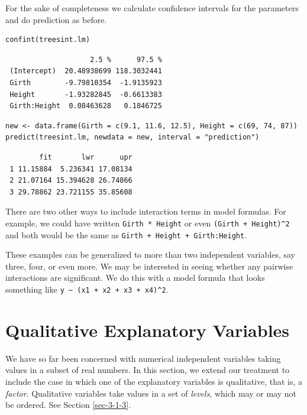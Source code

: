 \documentclass[captions=tableheading]{scrbook}
\begin{document}
For the sake of completeness we calculate confidence intervals for the parameters and do prediction as before.


\lstset{language=R}
\begin{lstlisting}
confint(treesint.lm)
\end{lstlisting}

\begin{verbatim}
                    2.5 %      97.5 %
 (Intercept)  20.48938699 118.3032441
 Girth        -9.79810354  -1.9135923
 Height       -1.93282845  -0.6613383
 Girth:Height  0.08463628   0.1846725
\end{verbatim}


\lstset{language=R}
\begin{lstlisting}
new <- data.frame(Girth = c(9.1, 11.6, 12.5), Height = c(69, 74, 87))
predict(treesint.lm, newdata = new, interval = "prediction")
\end{lstlisting}

\begin{verbatim}
        fit       lwr      upr
 1 11.15884  5.236341 17.08134
 2 21.07164 15.394628 26.74866
 3 29.78862 23.721155 35.85608
\end{verbatim}

\begin{rem}
There are two other ways to include interaction terms in model formulas. For example, we could have written \texttt{Girth * Height} or even \texttt{(Girth + Height)\textasciicircum{}2} and both would be the same as \texttt{Girth + Height + Girth:Height}. 
\end{rem}

These examples can be generalized to more than two independent variables, say three, four, or even more. We may be interested in seeing whether any pairwise interactions are significant. We do this with a model formula that looks something like \texttt{y \textasciitilde{} (x1 + x2 + x3 + x4)\textasciicircum{}2}.  
\section{Qualitative Explanatory Variables}
\label{sec-12-6}
\label{sec-Qualitative-Explanatory-Variables}


We have so far been concerned with numerical independent variables taking values in a subset of real numbers. In this section, we extend our treatment to include the case in which one of the explanatory variables is qualitative, that is, a \emph{factor}. Qualitative variables take values in a set of \emph{levels}, which may or may not be ordered. See Section \ref{sec-3-1-3}.
\end{document}

